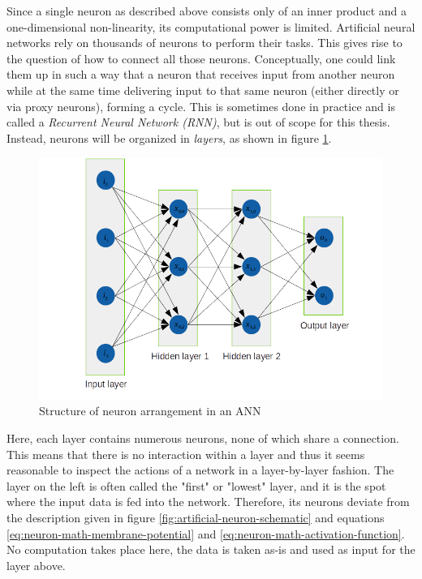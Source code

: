 \documentclass[11pt, a4paper]{article}
\begin{document}
Since a single neuron as described above consists only of an inner product and a one-dimensional non-linearity, its computational power is limited. Artificial neural networks rely on thousands of neurons to perform their tasks. This gives rise to the question of how to connect all those neurons. Conceptually, one could link them up in such a way that a neuron that receives input from another neuron while at the same time delivering input to that same neuron (either directly or via proxy neurons), forming a cycle. This is sometimes done in practice and is called a \emph{Recurrent Neural Network (RNN)}, but is out of scope for this thesis. Instead, neurons will be organized in \emph{layers}, as shown in figure \ref{fig:neural-nework-structure}. %

\begin{figure}[htb]
\centering
\includegraphics[width=\textwidth]{images/network_layout.png}
\caption{Structure of neuron arrangement in an ANN}
\label{fig:neural-nework-structure}
\end{figure}

Here, each layer contains numerous neurons, none of which share a connection. This means that there is no interaction within a layer and thus it seems reasonable to inspect the actions of a network in a layer-by-layer fashion. The layer on the left is often called the "first" or "lowest" layer, and it is the spot where the input data is fed into the network. Therefore, its neurons deviate from the description given in figure \ref{fig:artificial-neuron-schematic} and equations \eqref{eq:neuron-math-membrane-potential} and \eqref{eq:neuron-math-activation-function}. No computation takes place here, the data is taken as-is and used as input for the layer above.
\end{document}
